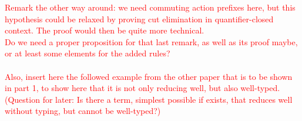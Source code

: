 \textcolor{red}{Remark the other way around: we need commuting action prefixes here, but this hypothesis could be relaxed by proving cut elimination in quantifier-closed context. The proof would then be quite more technical.}\\ %

\textcolor{red}{Do we need a proper proposition for that last remark, as well as its proof maybe, or at least some elements for the added rules?\\~\\
Also, insert here the followed example from the other paper that is to be shown in part 1, to show here that it is not only reducing well, but also well-typed. (Question for later: Is there a term, simplest possible if exists, that reduces well without typing, but cannot be well-typed?)} %